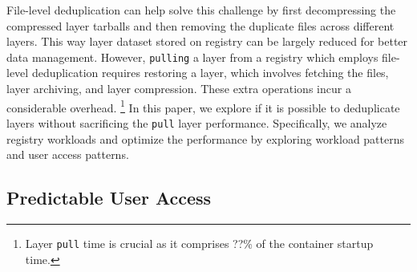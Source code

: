 File-level deduplication can help solve this challenge by first decompressing
the compressed layer tarballs and then removing the duplicate files across
different layers. This way layer dataset stored on registry can be
largely reduced for better data management. 
However, \texttt{pulling} a layer from a registry which employs file-level deduplication
requires restoring a layer, which involves fetching the files, layer
archiving, and layer compression.  These extra operations incur a considerable
overhead. \footnote{Layer \texttt{pull} time is crucial as
it comprises ??\% of the container startup time.}
In this paper, we explore if it is possible to deduplicate layers
without sacrificing the \texttt{pull} layer performance.
Specifically, we analyze registry workloads and
optimize the performance by exploring workload patterns and user access
patterns.   


\subsection{Predictable User Access} 

